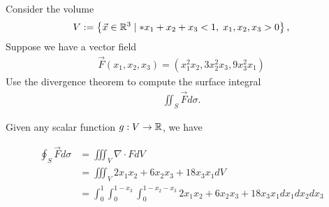 \documentclass[11pt]{article}
\begin{document}
\begin{exercise} %
    Consider the volume 
    \begin{align}
     V := \left\{ \vec x \in \bbR^3 \suchthat* x_1 + x_2 + x_3 < 1, \; x_1, x_2, x_3 > 0 \right\},
    \end{align}
    Suppose we have a vector field 
    \begin{align}
        \vec F(x_1,x_2,x_3) = \left( x_1^2 x_2, 3 x_2^{2} x_3, 9 x_3^{2} x_1 \right)
    \end{align}
    Use the divergence theorem to compute the surface integral 
    \begin{align}
        \iint_{S} \vec F d\sigma.
    \end{align}
\end{exercise}
\begin{solution}     
    Given any scalar function $g : V \to \mathbb{R}$, we have 

    \begin{align*}
        \oint_{S} \vec F d\sigma & = \iiint_V \nabla \cdot F dV\\
		&= \iiint_V 2x_1x_2 + 6x_2x_3 + 18x_3x_1 dV\\
		&= \int_{0}^{1}\int_{0}^{1 - x_3}\int_{0}^{1 - x_2 - x_3} 2x_1x_2 + 6x_2x_3 + 18x_3x_1 dx_1 dx_2 dx_3
    \end{align*}


\end{solution}
\end{document}
